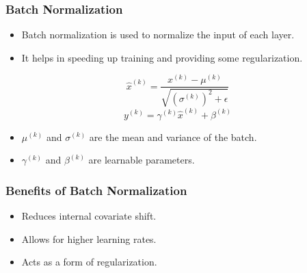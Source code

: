 \documentclass[aspectratio=169]{../latex_main/tntbeamer}  %
\begin{document}
    \begin{frame}
    \frametitle{Batch Normalization}
    \begin{itemize}
        \item Batch normalization is used to normalize the input of each layer.
        \item It helps in speeding up training and providing some regularization.
    \end{itemize}
    \begin{equation}
        \hat{x}^{(k)} = \frac{x^{(k)} - \mu^{(k)}}{\sqrt{(\sigma^{(k)})^2 + \epsilon}}
    \end{equation}
    \begin{equation}
        y^{(k)} = \gamma^{(k)} \hat{x}^{(k)} + \beta^{(k)}
    \end{equation}
    \begin{itemize}
        \item \(\mu^{(k)}\) and \(\sigma^{(k)}\) are the mean and variance of the batch.
        \item \(\gamma^{(k)}\) and \(\beta^{(k)}\) are learnable parameters.
    \end{itemize}
    \end{frame}
    
    \begin{frame}
    \frametitle{Benefits of Batch Normalization}
    \begin{itemize}
        \item Reduces internal covariate shift.
        \item Allows for higher learning rates.
        \item Acts as a form of regularization.
    \end{itemize}
    \end{frame}
    
\end{document}
